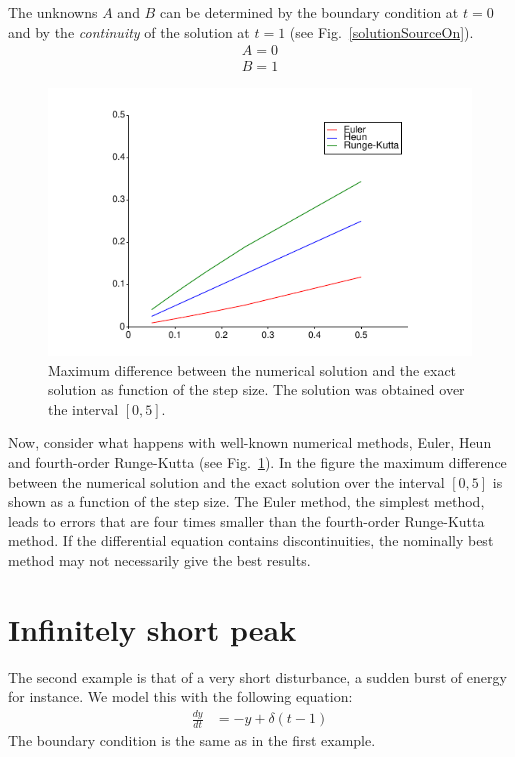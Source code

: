 \documentclass[onecolumn]{article}
\begin{document}
The unknowns $A$ and $B$ can be determined by the boundary condition at $t = 0$ and by the \emph{continuity}
of the solution at $t = 1$ (see Fig.\ \ref{solutionSourceOn}).
%
\begin{align}
             A = 0 \\
\nonumber    B = 1
\end{align}

\begin{figure}
\begin{center}
\includegraphics{jump1.pdf}
\caption{Maximum difference between the numerical solution and the exact solution as function
of the step size. The solution was obtained over the interval $[0,5]$.}
\label{figJump1}
\end{center}
\end{figure}


Now, consider what happens with well-known numerical methods, Euler, Heun and fourth-order Runge-Kutta
(see Fig.\ \ref{figJump1}). In the figure the maximum difference between the numerical solution and the
exact solution over the interval $[0,5]$ is shown as a function of the step size. The Euler method, the
simplest method, leads to errors that are four times smaller than the fourth-order Runge-Kutta method.
If the differential equation contains discontinuities, the nominally best method may not necessarily
give the best results.


\section*{Infinitely short peak}
The second example is that of a very short disturbance, a sudden burst of energy for instance. We model
this with the following equation:
%
\begin{align}
    \frac{dy}{dt} &= -y + \delta(t-1)
\end{align}
The boundary condition is the same as in the first example.
\end{document}
